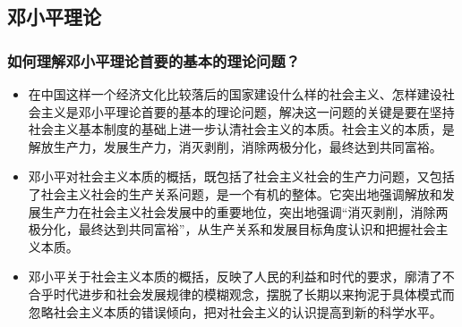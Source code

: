 \documentclass{article}
\begin{document}
\subsection{邓小平理论}

\subsubsection{如何理解邓小平理论首要的基本的理论问题？}
\begin{itemize}
    \item 在中国这样一个经济文化比较落后的国家建设什么样的社会主义、怎样建设社会主义是邓小平理论首要的基本的理论问题，解决这一问题的关键是要在坚持社会主义基本制度的基础上进一步认清社会主义的本质。社会主义的本质，是解放生产力，发展生产力，消灭剥削，消除两极分化，最终达到共同富裕。
    \item 邓小平对社会主义本质的概括，既包括了社会主义社会的生产力问题，又包括了社会主义社会的生产关系问题，是一个有机的整体。它突出地强调解放和发展生产力在社会主义社会发展中的重要地位，突出地强调“消灭剥削，消除两极分化，最终达到共同富裕”，从生产关系和发展目标角度认识和把握社会主义本质。
    \item 邓小平关于社会主义本质的概括，反映了人民的利益和时代的要求，廓清了不合乎时代进步和社会发展规律的模糊观念，摆脱了长期以来拘泥于具体模式而忽略社会主义本质的错误倾向，把对社会主义的认识提高到新的科学水平。
\end{itemize}
\end{document}
